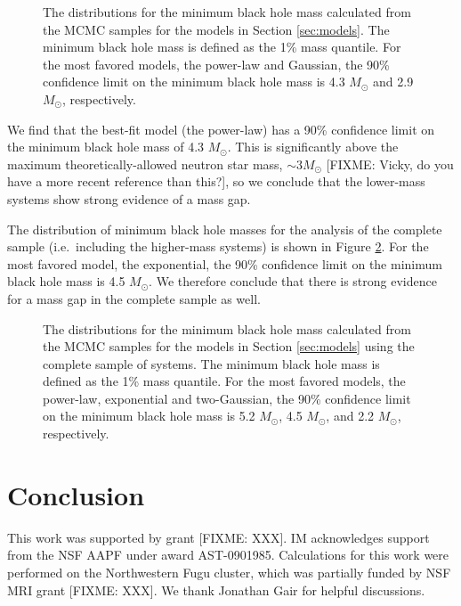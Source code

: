 \documentclass[preprint]{aastex}
\newcommand{\fixme}[1]{[FIXME: #1]}
\newcommand{\Msun}{M_\odot}
\begin{document}
\begin{figure}
  \begin{center}
  \end{center}
  \caption{\label{fig:min-mass} The distributions for the minimum
    black hole mass calculated from the MCMC samples for the models in
    Section \ref{sec:models}.  The minimum black hole mass is defined
    as the 1\% mass quantile.  For the most favored models, the
    power-law and Gaussian, the 90\% confidence limit on the minimum
    black hole mass is 4.3 $\Msun$ and 2.9 $\Msun$, respectively.}
\end{figure}

We find that the best-fit model (the power-law) has a 90\% confidence
limit on the minimum black hole mass of 4.3 $\Msun$.  This is
significantly above the maximum theoretically-allowed neutron star
mass, $\sim 3 \Msun$ \citep{Kalogera1996}\fixme{Vicky, do you have a
  more recent reference than this?}, so we conclude that the
lower-mass systems show strong evidence of a mass gap.

The distribution of minimum black hole masses for the analysis of the
complete sample (i.e.\ including the higher-mass systems) is shown in
Figure \ref{fig:high-min-mass}.  For the most favored model, the
exponential, the 90\% confidence limit on the minimum black hole mass
is 4.5 $\Msun$.  We therefore conclude that there is strong evidence
for a mass gap in the complete sample as well.

\begin{figure}
\begin{center}
  \end{center}
  \caption{\label{fig:high-min-mass} The distributions for the minimum
    black hole mass calculated from the MCMC samples for the models in
    Section \ref{sec:models} using the complete sample of systems.
    The minimum black hole mass is defined as the 1\% mass quantile.
    For the most favored models, the power-law, exponential and
    two-Gaussian, the 90\% confidence limit on the minimum black hole
    mass is 5.2 $\Msun$, 4.5 $\Msun$, and 2.2 $\Msun$, respectively.}
\end{figure}

\section{Conclusion}

\acknowledgements

This work was supported by grant \fixme{XXX}.  IM acknowledges support
from the NSF AAPF under award AST-0901985.  Calculations for this work
were performed on the Northwestern Fugu cluster, which was partially
funded by NSF MRI grant \fixme{XXX}.  We thank Jonathan Gair for
helpful discussions.


\end{document}

